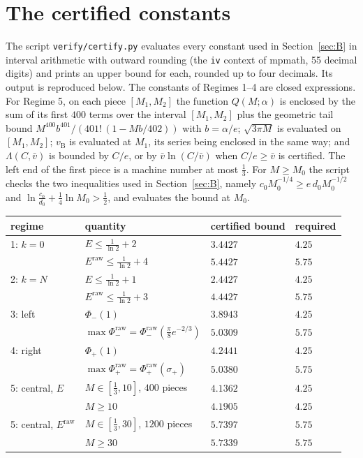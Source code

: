 \documentclass[11pt]{amsart}
\theoremstyle{remark}
\begin{document}
\section{The certified constants}\label{app:cert}
The script \texttt{verify/certify.py} evaluates every constant used in Section~\ref{sec:B} in interval arithmetic with outward rounding (the \texttt{iv} context of mpmath, 55 decimal digits) and prints an upper bound for each, rounded up to four decimals. Its output is reproduced below. The constants of Regimes 1--4 are closed expressions. For Regime 5, on each piece $[M_1, M_2]$ the function $Q(M;\alpha)$ is enclosed by the sum of its first $400$ terms over the interval $[M_1, M_2]$ plus the geometric tail bound $M^{400}b^{401}/(401!\,(1 - Mb/402))$ with $b = \alpha/e$; $\sqrt{3\pi M}$ is evaluated on $[M_1, M_2]$; $v_{\mathrm B}$ is evaluated at $M_1$, its series being enclosed in the same way; and $\Lambda(C, \bar v)$ is bounded by $C/e$, or by $\bar v\ln(C/\bar v)$ when $C/e \ge \bar v$ is certified. The left end of the first piece is a machine number at most $\frac13$. For $M \ge M_0$ the script checks the two inequalities used in Section~\ref{sec:B}, namely $c_0M_0^{-1/4} \ge e\,d_0M_0^{-1/2}$ and $\ln\frac{c_0}{d_0} + \frac14\ln M_0 > \frac12$, and evaluates the bound at $M_0$.

\medskip
\begin{center}
\begin{tabular}{llll}
\toprule
regime & quantity & certified bound & required \\
\midrule
1: $k = 0$ & $E \le \frac{1}{\ln 2} + 2$ & $3.4427$ & $4.25$ \\
 & $E^{\mathrm{raw}} \le \frac{1}{\ln 2} + 4$ & $5.4427$ & $5.75$ \\
2: $k = N$ & $E \le \frac{1}{\ln 2} + 1$ & $2.4427$ & $4.25$ \\
 & $E^{\mathrm{raw}} \le \frac{1}{\ln 2} + 3$ & $4.4427$ & $5.75$ \\
3: left & $\Phi_-(1)$ & $3.8943$ & $4.25$ \\
 & $\max\Phi_-^{\mathrm{raw}} = \Phi_-^{\mathrm{raw}}(\frac\pi8 e^{-2/3})$ & $5.0309$ & $5.75$ \\
4: right & $\Phi_+(1)$ & $4.2441$ & $4.25$ \\
 & $\max\Phi_+^{\mathrm{raw}} = \Phi_+^{\mathrm{raw}}(\sigma_+)$ & $5.0380$ & $5.75$ \\
5: central, $E$ & $M \in [\frac13, 10]$, $400$ pieces & $4.1362$ & $4.25$ \\
 & $M \ge 10$ & $4.1905$ & $4.25$ \\
5: central, $E^{\mathrm{raw}}$ & $M \in [\frac13, 30]$, $1200$ pieces & $5.7397$ & $5.75$ \\
 & $M \ge 30$ & $5.7339$ & $5.75$ \\
\bottomrule
\end{tabular}
\end{center}
\medskip
\end{document}
